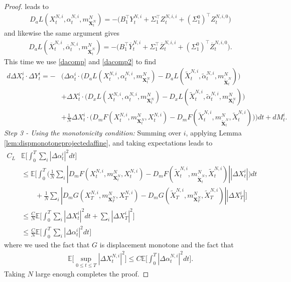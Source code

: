 \documentclass[11pt,reqno]{amsart}
\numberwithin{equation}{section}
\theoremstyle{definition}
\def\E{{\mathbb E}}
\newcommand{\bX}{\mathbf{X}}
\newcommand{\ov}{\overline}
\newcommand{\wt}{\widetilde}
\def \E{\mathbb{E}}
\begin{document}
\begin{proof}
leads to 
\begin{align} \label{dacomp}
    D_a L(X_t^{N,i}, \alpha_t^{N,i}, m_{\bX_t^N}^N) = - \Big( B_1^\top Y_t^{N,i} + \Sigma_1^\top Z_t^{N,i,i} + (\Sigma_1^0)^\top Z_t^{N,i,0} \Big) 
\end{align}
and likewise the same argument gives
\begin{align} \label{dacomp2}
    D_a L(\ov{X}_t^{N,i}, \ov{\alpha}_t^{N,i}, m_{\ov{\bX}_t^N}^N) = - \Big( B_1^\top \ov{Y}_t^{N,i} + \Sigma_1^\top \ov{Z}_t^{N,i,i} + (\Sigma_1^0)^\top \ov{Z}_t^{N,i,0} \Big).
\end{align}
This time we use \eqref{dacomp} and \eqref{dacomp2} to find 
\begin{align} \label{xydynamicsunqiueness2}
  \nonumber d \Delta X_t^i \cdot \Delta Y_t^{i} = - &\bigg(\Delta \alpha^i_t \cdot  \big(D_a L(X_t^{N,i}, \alpha_t^{N,i}, m_{\bX_t^N}^N) - D_a L(\wt{X}_t^{N,i}, \wt{\alpha}_t^{N,i}, m_{\wt{\bX}_t^N}^N) \big) \\
  &+ \Delta X_t^i \cdot \big(D_x L(X_t^{N,i}, \alpha_t^{N,i}, m_{\bX_t^N}^N) - D_x L(\wt{X}_t^{N,i}, \wt{\alpha}_t^{N,i}, m_{\bX_t^N}^N) \big) \nonumber \\
  &+ \frac{1}{N} \Delta X_t^i \cdot \big(D_m F(X_t^{N,i}, m_{\bX_t^N}^N, X_t^{N,i}) - D_m F(\wt{X}_t^{N,i}, m_{\bm{\wt{X}}_t^N}^N, \wt{X}_t^{N,i}) \big) \bigg) dt + dM_t^i.
\end{align}
\textit{Step 3 - Using the monotonicity condition:}
Summing over $i$, applying Lemma \ref{lem:dispmonotoneprojectedaffine}, and taking expectations leads to 
\begin{align} \label{smallnessunique2}
  C_L &\E \bigg[\int_0^T \sum_i |\Delta \alpha_t^i|^2 dt \bigg] \nonumber \\
    &\leq \E \bigg[ \int_0^T \Big( \frac{1}{N} \sum_i |D_m F(X_t^{N,i}, m_{\bX_t^N}^N, X_t^{N,i}) - D_m F(\wt{X}_t^{N,i}, m_{\bm{\wt{X}}_t^N}^N, \wt{X}_t^{N,i})||\Delta X_t^i|\Big) dt \nonumber \\
    & \quad \quad  + \frac{1}{N} \sum_i |D_m G(X_T^{N,i}, m_{\bX_T^N}^N, X_T^{N,i}) - D_m G(\wt{X}_T^{N,i}, m_{\bm{\bX}_T^N}^N, \wt{X}_T^{N,i})| |\Delta X_T^i| \bigg] \nonumber \\
  &\leq  \frac{C}{N} \E \bigg[ \int_0^T \sum_i |\Delta X_t^i|^2  dt + \sum_i |\Delta X_T^i|^2 \bigg] \nonumber \\
  &\leq  \frac{C}{N} \E\bigg[ \int_0^T\sum_i |\Delta \alpha_t^i|^2 dt\bigg]
\end{align}
where we used the fact that $G$ is displacement monotone and the fact that 
\begin{align*}
    \E\Big[\sup_{0 \leq t \leq T} |\Delta X_t^{N,i}|^2 \Big] \leq C \E\bigg[\int_0^T |\Delta \alpha_t^{N,i}|^2 dt\bigg]. 
\end{align*}
Taking $N$ large enough completes the proof.
\end{proof}
\end{document}
